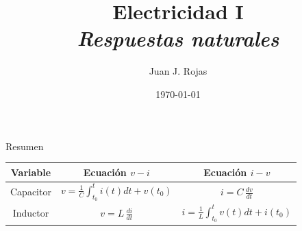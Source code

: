 \documentclass[aspectratio=169]{beamer}
\title{Electricidad I \\ \emph{Respuestas naturales}}
\author{
    Juan J. Rojas
}
\institute{Instituto Tecnológico de Costa Rica}
\date{\today}
\begin{document}
\maketitle
{} %

\begin{frame}{Resumen}
    \begin{center}
        \begin{tabularx}{14cm}{C C C}
        \toprule
        Variable & Ecuación $v-i$ & Ecuación $i-v$ \\
        \midrule
       Capacitor & $v=\frac{1}{C}\int_{t_0}^{t} i(t)dt + v(t_0) $ & $i = C\,\frac{dv}{dt}$ \\[5pt]
        Inductor & $v = L\,\frac{di}{dt}$ & $i=\frac{1}{L}\int_{t_0}^{t} v(t)dt + i(t_0) $\\[5pt]
        \bottomrule
        \end{tabularx}   
    \end{center}
\end{frame}
\end{document}

